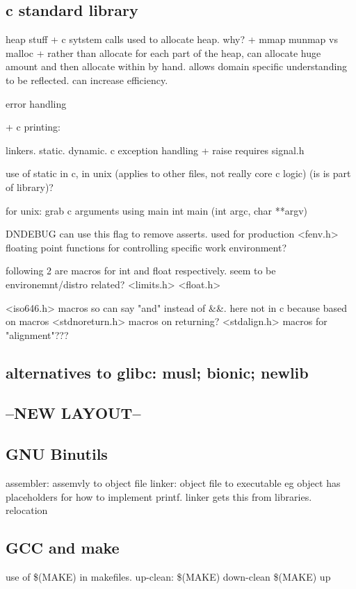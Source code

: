 \subsection{c standard library}


heap stuff
+ c sytstem calls used to allocate heap. why?
+ mmap munmap vs malloc
+ rather than allocate for each part of the heap, can allocate huge amount and then allocate within by hand. allows domain specific understanding to be reflected. can increase efficiency.

error handling

+ c printing: %

linkers. static. dynamic.
c exception handling
+ raise requires signal.h

use of static in c, in unix (applies to other files, not really core c logic) (is is part of library)?

for unix: grab c arguments using main
int main (int argc, char **argv)

DNDEBUG can use this flag to remove asserts. used for production
<fenv.h> floating point functions for controlling specific work environment?

following 2 are macros for int and float respectively. seem to be environemnt/distro related?
<limits.h>
<float.h>

<iso646.h> macros so can say "and" instead of \&\&. here not in c because based on macros
<stdnoreturn.h> macros on returning?
<stdalign.h> macros for "alignment"???
\subsection{alternatives to glibc: musl; bionic; newlib}
\subsection{--NEW LAYOUT--}
\subsection{GNU Binutils}
assembler: assemvly to object file
linker: object file to executable
eg object has placeholders for how to implement printf. linker gets this from libraries. relocation
\subsection{GCC and make}
use of \$(MAKE) in makefiles.
up-clean:
  \$(MAKE) down-clean
  \$(MAKE) up

